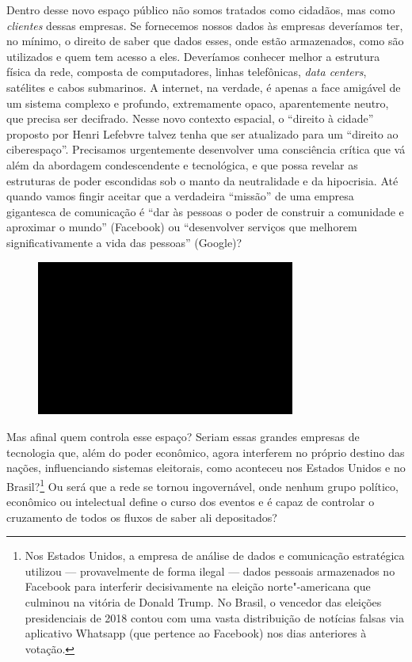 Dentro desse novo espaço público não somos tratados como cidadãos, mas
como \emph{clientes} dessas empresas. Se fornecemos nossos dados às
empresas deveríamos ter, no mínimo, o direito de saber que dados esses, onde estão armazenados, como são utilizados e quem tem acesso a eles. Deveríamos conhecer melhor a estrutura física da rede, composta de computadores, linhas telefônicas, \emph{data centers}, satélites e cabos submarinos. A internet, na verdade, é apenas a face amigável de um sistema complexo e
profundo, extremamente opaco, aparentemente neutro, que precisa ser decifrado.
Nesse novo contexto espacial, o ``direito à cidade'' proposto por Henri
Lefebvre talvez tenha que ser atualizado para um ``direito ao
ciberespaço''. Precisamos urgentemente desenvolver uma consciência
crítica que vá além da abordagem condescendente e tecnológica, e que
possa revelar as estruturas de poder escondidas sob o manto da
neutralidade e da hipocrisia. Até quando vamos fingir aceitar que a
verdadeira ``missão'' de uma empresa gigantesca de comunicação é ``dar
às pessoas o poder de construir a comunidade e aproximar o mundo''
(Facebook) ou ``desenvolver serviços que melhorem significativamente a
vida das pessoas'' (Google)?

\begin{figure}[!ht]

\centering
 \includegraphics[width=85mm]{./imgs/im1.jpg}
\caption{\tiny{}}

\end{figure}

Mas afinal quem controla esse espaço? Seriam essas grandes empresas de
tecnologia que, além do poder econômico, agora interferem no próprio
destino das nações, influenciando sistemas eleitorais, como aconteceu
nos Estados Unidos e no Brasil?\footnote{Nos Estados Unidos, a empresa
  de análise de dados e comunicação estratégica {}
  utilizou --- provavelmente de forma ilegal --- dados pessoais
  armazenados no Facebook para interferir decisivamente na eleição
  norte"-americana que culminou na vitória de Donald Trump. No Brasil, o
  vencedor das eleições presidenciais de 2018 contou com uma vasta
  distribuição de notícias falsas via aplicativo Whatsapp (que pertence
  ao Facebook) nos dias anteriores à votação.} Ou será que a rede se
tornou ingovernável, onde nenhum grupo político, econômico ou
intelectual define o curso dos eventos e é capaz de controlar o
cruzamento de todos os fluxos de saber ali depositados?

